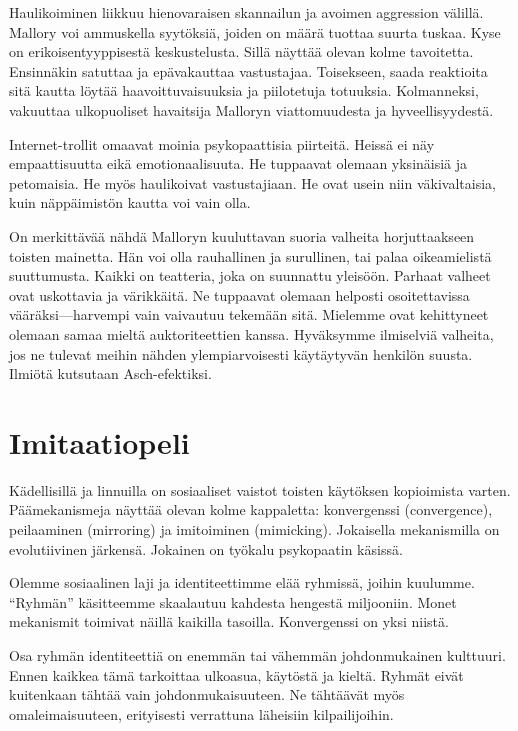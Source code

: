 Haulikoiminen liikkuu hienovaraisen skannailun ja avoimen aggression välillä. Mallory voi ammuskella syytöksiä, joiden on määrä tuottaa suurta tuskaa. Kyse on erikoisentyyppisestä keskustelusta. Sillä näyttää olevan kolme tavoitetta. Ensinnäkin satuttaa ja epävakauttaa vastustajaa. Toisekseen, saada reaktioita sitä kautta löytää haavoittuvaisuuksia ja piilotetuja totuuksia. Kolmanneksi, vakuuttaa ulkopuoliset havaitsija Malloryn viattomuudesta ja hyveellisyydestä.

Internet-trollit omaavat moinia psykopaattisia piirteitä. Heissä ei näy empaattisuutta eikä emotionaalisuuta. He tuppaavat olemaan yksinäisiä ja petomaisia. He myös haulikoivat vastustajiaan. He ovat usein niin väkivaltaisia, kuin näppäimistön kautta voi vain olla.

On merkittävää nähdä Malloryn kuuluttavan suoria valheita horjuttaakseen toisten mainetta. Hän voi olla rauhallinen ja surullinen, tai palaa oikeamielistä suuttumusta. Kaikki on teatteria, joka on suunnattu yleisöön. Parhaat valheet ovat uskottavia ja värikkäitä. Ne tuppaavat olemaan helposti osoitettavissa vääräksi---harvempi vain vaivautuu tekemään sitä. Mielemme ovat kehittyneet olemaan samaa mieltä auktoriteettien kanssa. Hyväksymme ilmiselviä valheita, jos ne tulevat meihin nähden ylempiarvoisesti käytäytyvän henkilön suusta. Ilmiötä kutsutaan Asch-efektiksi.

\section{Imitaatiopeli}

Kädellisillä ja linnuilla on sosiaaliset vaistot toisten käytöksen kopioimista varten. Päämekanismeja näyttää olevan kolme kappaletta: konvergenssi (convergence), peilaaminen (mirroring) ja imitoiminen (mimicking). Jokaisella mekanismilla on evolutiivinen järkensä. Jokainen on työkalu psykopaatin käsissä.

Olemme sosiaalinen laji ja identiteettimme elää ryhmissä, joihin kuulumme. ``Ryhmän'' käsitteemme skaalautuu kahdesta hengestä miljooniin. Monet mekanismit toimivat näillä kaikilla tasoilla. Konvergenssi on yksi niistä.

Osa ryhmän identiteettiä on enemmän tai vähemmän johdonmukainen kulttuuri. Ennen kaikkea tämä tarkoittaa ulkoasua, käytöstä ja kieltä. Ryhmät eivät kuitenkaan tähtää vain johdonmukaisuuteen. Ne tähtäävät myös omaleimaisuuteen, erityisesti verrattuna läheisiin kilpailijoihin.

